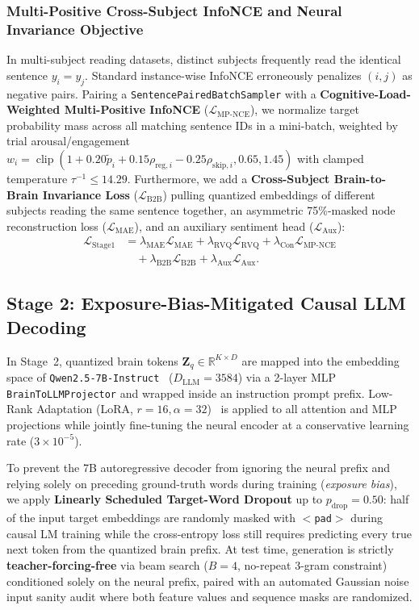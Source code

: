 \documentclass[journal]{IEEEtran}
\begin{document}
\subsubsection{Multi-Positive Cross-Subject InfoNCE and Neural Invariance Objective}
In multi-subject reading datasets, distinct subjects frequently read the identical sentence $y_i = y_j$. Standard instance-wise InfoNCE erroneously penalizes $(i,j)$ as negative pairs. Pairing a \texttt{SentencePairedBatchSampler} with a \textbf{Cognitive-Load-Weighted Multi-Positive InfoNCE} ($\mathcal{L}_{\text{MP-NCE}}$), we normalize target probability mass across all matching sentence IDs in a mini-batch, weighted by trial arousal/engagement $w_i = \operatorname{clip}(1 + 0.20\tilde{p}_i + 0.15\rho_{\text{reg},i} - 0.25\rho_{\text{skip},i}, 0.65, 1.45)$ with clamped temperature $\tau^{-1} \le 14.29$. Furthermore, we add a \textbf{Cross-Subject Brain-to-Brain Invariance Loss} ($\mathcal{L}_{\text{B2B}}$) pulling quantized embeddings of different subjects reading the same sentence together, an asymmetric 75\%-masked node reconstruction loss ($\mathcal{L}_{\text{MAE}}$), and an auxiliary sentiment head ($\mathcal{L}_{\text{Aux}}$):
\begin{equation}
\begin{aligned}
    \mathcal{L}_{\text{Stage1}} &= \lambda_{\text{MAE}}\mathcal{L}_{\text{MAE}} + \lambda_{\text{RVQ}}\mathcal{L}_{\text{RVQ}} + \lambda_{\text{Con}}\mathcal{L}_{\text{MP-NCE}} \\
    &\quad + \lambda_{\text{B2B}}\mathcal{L}_{\text{B2B}} + \lambda_{\text{Aux}}\mathcal{L}_{\text{Aux}}.
\end{aligned}
\end{equation}

\subsection{Stage 2: Exposure-Bias-Mitigated Causal LLM Decoding}
In Stage~2, quantized brain tokens $\mathbf{Z}_q \in \mathbb{R}^{K \times D}$ are mapped into the embedding space of \texttt{Qwen2.5-7B-Instruct}~\cite{qwen25} ($D_{\text{LLM}} = 3584$) via a 2-layer MLP \texttt{BrainToLLMProjector} and wrapped inside an instruction prompt prefix. Low-Rank Adaptation (LoRA, $r=16, \alpha=32$)~\cite{hu2022lora} is applied to all attention and MLP projections while jointly fine-tuning the neural encoder at a conservative learning rate ($3\times 10^{-5}$).

To prevent the 7B autoregressive decoder from ignoring the neural prefix and relying solely on preceding ground-truth words during training (\textit{exposure bias}), we apply \textbf{Linearly Scheduled Target-Word Dropout} up to $p_{\text{drop}} = 0.50$: half of the input target embeddings are randomly masked with \texttt{$<$pad$>$} during causal LM training while the cross-entropy loss still requires predicting every true next token from the quantized brain prefix. At test time, generation is strictly \textbf{teacher-forcing-free} via beam search ($B=4$, no-repeat 3-gram constraint) conditioned solely on the neural prefix, paired with an automated Gaussian noise input sanity audit where both feature values and sequence masks are randomized.
\end{document}
